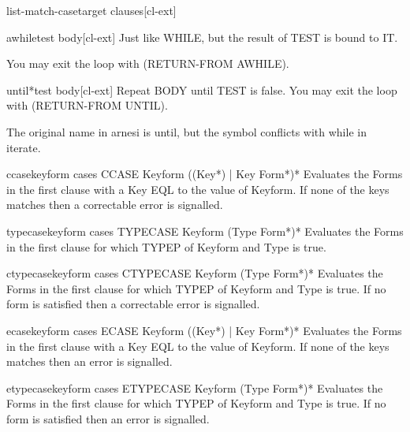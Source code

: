 \documentclass[10pt,english]{book}
\begin{document}
\begin{macro}{list-match-case}{target \body clauses}[cl-ext]
  
\end{macro}

\begin{macro}{awhile}{test \body body}[cl-ext]
  Just like WHILE, but the result of TEST is bound to IT.

You may exit the loop with (RETURN-FROM AWHILE).
\end{macro}

\begin{macro}{until*}{test \body body}[cl-ext]
  Repeat BODY until TEST is false. You may exit the loop with
  (RETURN-FROM UNTIL).
  \begin{devnote}
    The original name in arnesi is until, but the symbol conflicts
    with while in iterate.
  \end{devnote}
\end{macro}

\begin{macro}{ccase}{keyform \body cases}
  CCASE Keyform {({(Key*) | Key} Form*)}*
  Evaluates the Forms in the first clause with a Key EQL to the value of
  Keyform. If none of the keys matches then a correctable error is
  signalled.
\end{macro}

\begin{macro}{typecase}{keyform \body cases}
  TYPECASE Keyform {(Type Form*)}*
  Evaluates the Forms in the first clause for which TYPEP of Keyform and Type
  is true.
\end{macro}

\begin{macro}{ctypecase}{keyform \body cases}
  CTYPECASE Keyform {(Type Form*)}*
  Evaluates the Forms in the first clause for which TYPEP of Keyform and Type
  is true. If no form is satisfied then a correctable error is signalled.
\end{macro}

\begin{macro}{ecase}{keyform \body cases}
  ECASE Keyform {({(Key*) | Key} Form*)}*
  Evaluates the Forms in the first clause with a Key EQL to the value of
  Keyform. If none of the keys matches then an error is signalled.
\end{macro}

\begin{macro}{etypecase}{keyform \body cases}
  ETYPECASE Keyform {(Type Form*)}*
  Evaluates the Forms in the first clause for which TYPEP of Keyform and Type
  is true. If no form is satisfied then an error is signalled.
\end{macro}
\end{document}
